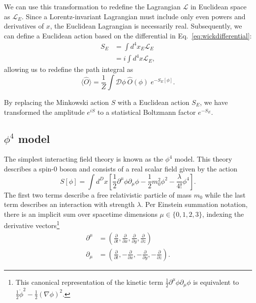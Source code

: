 \documentclass[12pt]{report}
\begin{document}
We can use this transformation to redefine the Lagrangian $\mathcal{L}$ in Euclidean space as $\mathcal{L}_E$. Since a Lorentz-invariant Lagrangian must include only even powers and derivatives of $x$, the Euclidean Lagrangian is necessarily real. Subsequently, we can define a Euclidean action based on the differential in Eq.~\ref{eq:wickdifferential}:
\begin{align}
    S_E &= \int d^4x_E \mathcal{L}_E \\
    &= i \int d^4x \mathcal{L}_E,
\end{align}
allowing us to redefine the path integral as 
\begin{equation}
    \label{eq:pathintegraleuclidean}
    \langle \hat O \rangle = \frac{1}{Z} \int \mathcal{D}\phi \: \hat O (\phi)\; e^{-S_E[\phi]}.
\end{equation}

By replacing the Minkowski action $S$ with a Euclidean action $S_E$, we have transformed the amplitude $e^{iS}$ to a statistical Boltzmann factor $e^{-S_E}$.

\subsection{$\phi^4$ model}
\label{sec:phi4}

The simplest interacting field theory is known as the $\phi^4$ model. This theory describes a spin-0 boson and consists of a real scalar field given by the action
\begin{equation}
    \label{eq:phi4 action}
    S[\phi] = \int d^D x \left[ \frac{1}{2}\partial^\mu \phi \partial_\mu\phi - \frac{1}{2} m_0^2 \phi^2 - \frac{\lambda}{4!}\phi^4\right].
\end{equation}
The first two terms describe a free relativistic particle of mass $m_0$ while the last term describes an interaction with strength $\lambda$. Per Einstein summation notation, there is an implicit sum over spacetime dimensions $\mu\in\{0,1,2,3\}$, indexing the derivative vectors\footnote{This canonical representation of the kinetic term $\frac{1}{2}\partial^\mu\phi\partial_\mu\phi$ is equivalent to $\frac{1}{2}\dot\phi^2-\frac{1}{2}\left(\nabla \phi\right)^2$.}
\begin{align*}
    \partial^\mu &= \left( \frac{\partial}{\partial t}, \frac{\partial}{\partial x},\frac{\partial}{\partial y}, \frac{\partial}{\partial z} \right) \\
    \partial_\mu &= \left( \frac{\partial}{\partial t}, -\frac{\partial}{\partial x}, -\frac{\partial}{\partial y}, -\frac{\partial}{\partial z} \right).
\end{align*}
\end{document}

